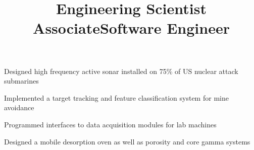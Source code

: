 \documentclass[12pt, tweaklist, line]{res}
\let\tempone\itemize
\let\temptwo\enditemize
\renewenvironment{itemize}{\tempone\vspace{-.15in}\setlength{\topsep}{0pt}\setlength{\itemsep}{3pt}\vspace{-.15in}}{\temptwo}
\def\Cplusplus{C++}
\begin{document}
\begin{resume}
\title{Engineering Scientist Associate} %
\begin{position}
\begin{itemize}
\item Designed high frequency active sonar installed on 75\% of US nuclear attack submarines
\item Implemented a target tracking and feature classification system for mine avoidance
\end{itemize}
\end{position}

\title{Software Engineer}
\begin{position}
\begin{itemize}
\item Programmed interfaces to data acquisition modules for lab machines
\item Designed a mobile desorption oven as well as porosity and core gamma systems
\end{itemize}
\end{position}


\end{resume}
\end{document}
